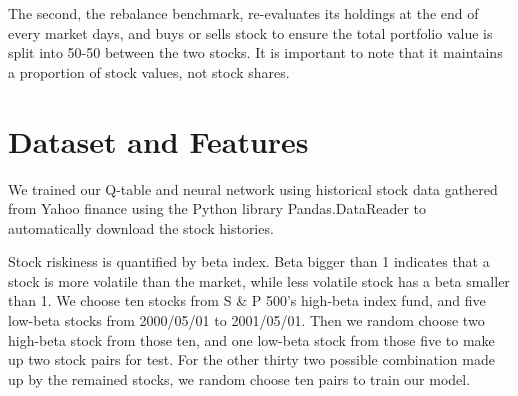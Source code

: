 The second, the rebalance benchmark, re-evaluates its holdings at the end of every market days, and buys or sells stock to ensure the total portfolio value is split into 50-50 between the two stocks. It is important to note that it maintains a proportion of stock values, not stock shares.

\section{Dataset and Features}
We trained our Q-table and neural network using historical stock data gathered from Yahoo finance using the Python library Pandas.DataReader to automatically download the stock histories. 

Stock riskiness is quantified by beta index. Beta bigger than 1 indicates that a stock is more volatile than the market, while less volatile stock has a beta smaller than 1. We choose ten stocks from S \& P 500’s high-beta index fund, and five low-beta stocks from 2000/05/01 to 2001/05/01. Then we random choose two high-beta stock from those ten, and one low-beta stock from those five to make up two stock pairs for test. For the other thirty two possible combination made up by the remained stocks, we random choose ten pairs to train our model. 
